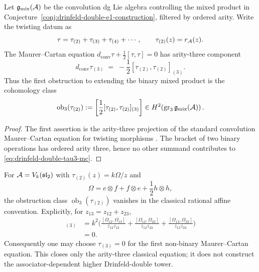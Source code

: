 \begin{proposition}
\label{prop:drinfeld-double-tau3-mc}
%
%
Let $\mathfrak g_{\mathrm{mix}}(\mathcal{A})$ be the convolution dg Lie algebra
controlling the mixed product in
Conjecture~\ref{conj:drinfeld-double-e1-construction}, filtered by
ordered arity. Write the twisting datum as
\[
 \tau=\tau_{(2)}+\tau_{(3)}+\tau_{(4)}+\cdots,
 \qquad
 \tau_{(2)}(z)=r_{\mathcal{A}}(z).
\]
The Maurer--Cartan equation
$d_{\mathrm{conv}}\tau+\frac12[\tau,\tau]=0$ has arity-three component
\begin{equation}\label{eq:drinfeld-double-tau3-mc}
 d_{\mathrm{conv}}\tau_{(3)}
 \;=\;
 -\frac12[\tau_{(2)},\tau_{(2)}]_{(3)} .
\end{equation}
Thus the first obstruction to extending the binary mixed product is the
cohomology class
\begin{equation}\label{eq:drinfeld-double-ob3}
 \operatorname{ob}_3(\tau_{(2)})
 :=
 \left[\frac12[\tau_{(2)},\tau_{(2)}]_{(3)}\right]
 \in H^2\!\left(\operatorname{gr}_3
 \mathfrak g_{\mathrm{mix}}(\mathcal{A})\right).
\end{equation}
\end{proposition}

\begin{proof}
The first assertion is the arity-three projection of the standard
convolution Maurer--Cartan equation for twisting morphisms
\cite[Ch.~6 and Ch.~10]{LV12}. The bracket of two binary operations
has ordered arity three, hence no other summand contributes to
\eqref{eq:drinfeld-double-tau3-mc}.
\end{proof}

\begin{computation}
\label{comp:drinfeld-double-sl2-tau3}
%
For $\mathcal{A}=V_k(\mathfrak{sl}_2)$ with
$\tau_{(2)}(z)=k\Omega/z$ and
\[
 \Omega=e\otimes f+f\otimes e+\frac12 h\otimes h,
\]
the obstruction class
$\operatorname{ob}_3(\tau_{(2)})$ vanishes in the classical rational
affine convention. Explicitly, for $z_{13}=z_{12}+z_{23}$,
\begin{align}
[\tau_{(2)},\tau_{(2)}]_{(3)}
&=
k^2\Bigg(
\frac{[\Omega_{12},\Omega_{13}]}{z_{12}z_{13}}
+\frac{[\Omega_{12},\Omega_{23}]}{z_{12}z_{23}}
+\frac{[\Omega_{13},\Omega_{23}]}{z_{13}z_{23}}
\Bigg) \nonumber\\
&=0.
\label{eq:drinfeld-double-sl2-cybe}
\end{align}
Consequently one may choose $\tau_{(3)}=0$ for the first non-binary
Maurer--Cartan equation. This closes only the arity-three classical
equation; it does not construct the associator-dependent higher
Drinfeld-double tower.
\end{computation}

